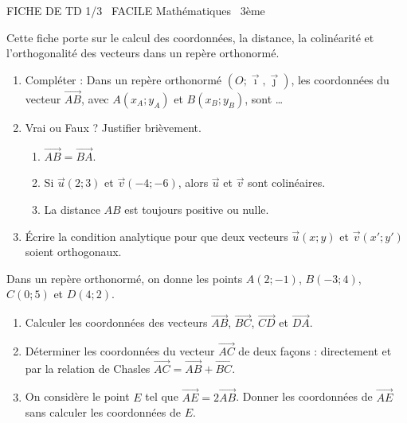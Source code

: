 \documentclass[11pt]{article}
\begin{document}
\begin{tcolorbox}[enhanced,colback=popink,colframe=popink,arc=10pt,boxrule=0pt,left=12pt,right=12pt,top=9pt,bottom=9pt]
{\color{white}\popxbold\small FICHE DE TD 1/3 \textbullet\ FACILE \hfill Mathématiques \textbullet\ 3ème\par}
\end{tcolorbox}
\vspace{4pt}
Cette fiche porte sur le calcul des coordonnées, la distance, la colinéarité et l'orthogonalité des vecteurs dans un repère orthonormé.

\begin{exercice}
\begin{enumerate}
    \item Compléter : Dans un repère orthonormé $(O;\vec{\imath},\vec{\jmath})$, les coordonnées du vecteur $\overrightarrow{AB}$, avec $A(x_A;y_A)$ et $B(x_B;y_B)$, sont \ldots
    \item Vrai ou Faux ? Justifier brièvement.
    \begin{enumerate}
        \item $\overrightarrow{AB} = \overrightarrow{BA}$.
        \item Si $\vec{u}(2;3)$ et $\vec{v}(-4;-6)$, alors $\vec{u}$ et $\vec{v}$ sont colinéaires.
        \item La distance $AB$ est toujours positive ou nulle.
    \end{enumerate}
    \item Écrire la condition analytique pour que deux vecteurs $\vec{u}(x;y)$ et $\vec{v}(x';y')$ soient orthogonaux.
\end{enumerate}
\end{exercice}

\begin{exercice}
Dans un repère orthonormé, on donne les points $A(2;-1)$, $B(-3;4)$, $C(0;5)$ et $D(4;2)$.
\begin{enumerate}
    \item Calculer les coordonnées des vecteurs $\overrightarrow{AB}$, $\overrightarrow{BC}$, $\overrightarrow{CD}$ et $\overrightarrow{DA}$.
    \item Déterminer les coordonnées du vecteur $\overrightarrow{AC}$ de deux façons : directement et par la relation de Chasles $\overrightarrow{AC} = \overrightarrow{AB} + \overrightarrow{BC}$.
    \item On considère le point $E$ tel que $\overrightarrow{AE} = 2\overrightarrow{AB}$. Donner les coordonnées de $\overrightarrow{AE}$ sans calculer les coordonnées de $E$.
\end{enumerate}
\end{exercice}
\end{document}
